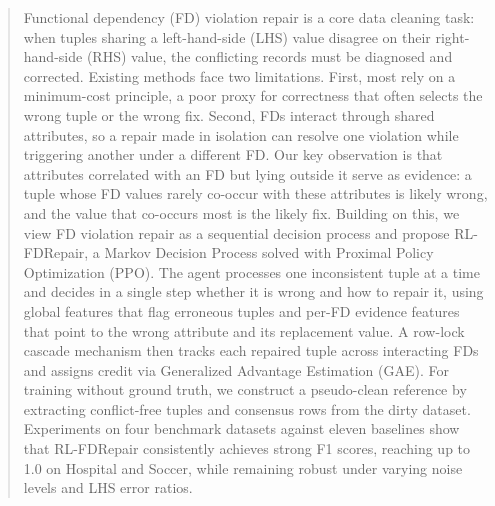 \documentclass[sigconf]{acmart}
\begin{document}
\begin{abstract}
Functional dependency (FD) violation repair is a core data cleaning task: when tuples sharing a left-hand-side (LHS) value disagree on their right-hand-side (RHS) value, the conflicting records must be diagnosed and corrected. Existing methods face two limitations. First, most rely on a minimum-cost principle, a poor proxy for correctness that often selects the wrong tuple or the wrong fix. Second, FDs interact through shared attributes, so a repair made in isolation can resolve one violation while triggering another under a different FD. Our key observation is that attributes correlated with an FD but lying outside it serve as evidence: a tuple whose FD values rarely co-occur with these attributes is likely wrong, and the value that co-occurs most is the likely fix. Building on this, we view FD violation repair as a sequential decision process and propose RL-FDRepair, a Markov Decision Process solved with Proximal Policy Optimization (PPO). The agent processes one inconsistent tuple at a time and decides in a single step whether it is wrong and how to repair it, using global features that flag erroneous tuples and per-FD evidence features that point to the wrong attribute and its replacement value. A row-lock cascade mechanism then tracks each repaired tuple across interacting FDs and assigns credit via Generalized Advantage Estimation (GAE). For training without ground truth, we construct a pseudo-clean reference by extracting conflict-free tuples and consensus rows from the dirty dataset. Experiments on four benchmark datasets against eleven baselines show that RL-FDRepair consistently achieves strong F1 scores, reaching up to 1.0 on Hospital and Soccer, while remaining robust under varying noise levels and LHS error ratios.
\end{abstract}

\maketitle
\end{document}
